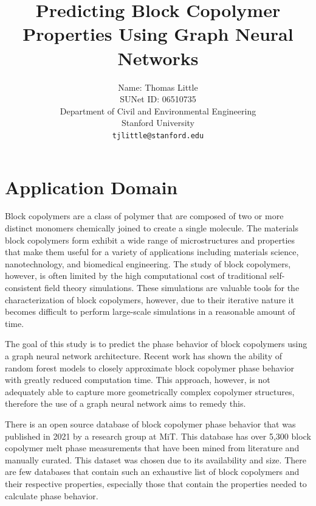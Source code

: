 \documentclass{article}
\title{
  Predicting Block Copolymer Properties Using Graph Neural Networks \\
}
\author{
  Name: Thomas Little\\
  SUNet ID: 06510735\\
  Department of Civil and Environmental Engineering \\
  Stanford University \\
  \texttt{tjlittle@stanford.edu} \\
}
\begin{document}
\maketitle



\section{Application Domain}
Block copolymers are a class of polymer that are composed of two or more distinct monomers chemically joined to create a single molecule. The materials block copolymers form exhibit a wide range of microstructures and properties that make them useful for a variety of applications including materials science, nanotechnology, and biomedical engineering. The study of block copolymers, however, is often limited by the high computational cost of traditional self-consistent field theory simulations. These simulations are valuable tools for the characterization of block copolymers, however, due to their iterative nature it becomes difficult to perform large-scale simulations in a reasonable amount of time.

The goal of this study is to predict the phase behavior of block copolymers using a graph neural network architecture. Recent work has shown the ability of random forest models to closely approximate block copolymer phase behavior with greatly reduced computation time\cite{RandForest}. This approach, however, is not adequately able to capture more geometrically complex copolymer structures, therefore the use of a graph neural network aims to remedy this.

There is an open source database of block copolymer phase behavior that was published in 2021 by a research group at MiT\cite{BCDB}. This database has over 5,300 block copolymer melt phase measurements that have been mined from literature and manually curated. This dataset was chosen due to its availability and size. There are few databases that contain such an exhaustive list of block copolymers and their respective properties, especially those that contain the properties needed to calculate phase behavior.
\end{document}

